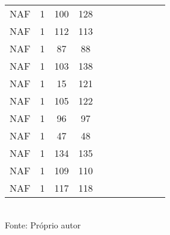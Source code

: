 \begin{table}[H]
{\begin{tabular}{ccccccccccc}
NAF & 1 & 100 & 128 &  &  &  &  &  &  &  \\
NAF & 1 & 112 & 113 &  &  &  &  &  &  &  \\
NAF & 1 & 87 & 88 &  &  &  &  &  &  &  \\
NAF & 1 & 103 & 138 &  &  &  &  &  &  &  \\
NAF & 1 & 15 & 121 &  &  &  &  &  &  &  \\
NAF & 1 & 105 & 122 &  &  &  &  &  &  &  \\
NAF & 1 & 96 & 97 &  &  &  &  &  &  &  \\
NAF & 1 & 47 & 48 &  &  &  &  &  &  &  \\
NAF & 1 & 134 & 135 &  &  &  &  &  &  &  \\
NAF & 1 & 109 & 110 &  &  &  &  &  &  &  \\
NAF & 1 & 117 & 118 &  &  &  &  &  &  &  \\
\bottomrule
\end{tabular}}
\\Fonte: Próprio autor
\end{table}


